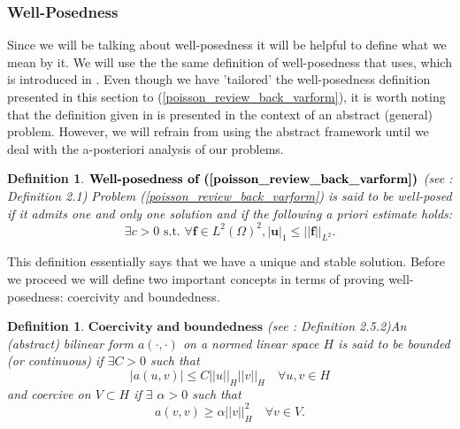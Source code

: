\documentclass[12pt,a4paper]{article}
\newtheorem{definition}[theorem]{Definition}
\theoremstyle{definition}
\begin{document}
\subsubsection{Well-Posedness}
Since we will be talking about well-posedness it will be helpful to define what we mean by it.  We will use the the same definition of well-posedness that \cite{ern2013theory} uses, which is introduced in \cite{hadamard1932probleme}.  Even though we have 'tailored' the well-posedness definition presented in this section to  (\ref{poisson_review_back_varform}), it is worth noting that the definition given in \cite{ern2013theory} is presented in the context of an abstract (general) problem.  However, we will refrain from using the abstract framework until we deal with the a-posteriori analysis of our problems.
\theoremstyle{definition}
\begin{definition}{$\textbf{Well-posedness of (\ref{poisson_review_back_varform})}$} (see \cite{ern2013theory}: Definition 2.1)
	Problem (\ref{poisson_review_back_varform}) is said to be well-posed if it admits one and only one solution and if the following a priori estimate holds:
	\begin{equation}
\exists c >0 \text{ s.t. } \forall \textbf{f} \in L^2\left(\Omega\right)^2, \left|\textbf{u}\right|_{1}\leq \left|\left|\textbf{f}\right|\right|_{L^2}.
	\end{equation}
\end{definition}
This definition essentially says that we have a unique and stable solution.  Before we proceed we will  define two important concepts in terms of proving well-posedness: coercivity and boundedness.
\theoremstyle{definition}
\begin{definition}{$\textbf{Coercivity and boundedness}$} (see \cite{brenner2007mathematical}: Definition 2.5.2)\label{defn_coerc_bound}
	An (abstract) bilinear form $a\left(\cdot,\cdot\right)$ on a normed linear space $H$ is said  to be bounded (or continuous) if $\exists C > 0$ such that
	\begin{equation}
	\left|a\left(u,v\right)\right|\leq C \left|\left|u\right|\right|_H\left|\left|v\right|\right|_H \quad \forall u,v \in H\nonumber
	\end{equation}
	and coercive on $V\subset H$ if $\exists$ $\alpha > 0$ such that
	\begin{equation}
	a\left(v,v\right)\geq \alpha \left|\left|v\right|\right|_H^2\quad \forall v \in V\nonumber.
	\end{equation}
\end{definition}
\end{document}
